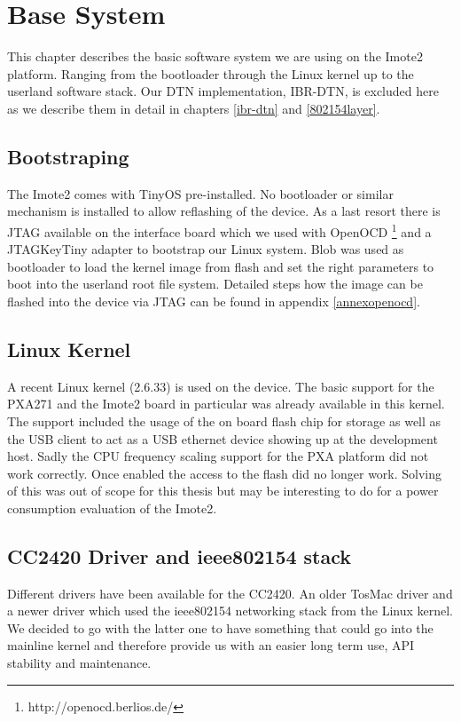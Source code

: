 \chapter{Base System}
This chapter describes the basic software system we are using on the Imote2
platform. Ranging from the bootloader through the Linux kernel up to the
userland software stack. Our DTN implementation, IBR-DTN, is excluded here as we
describe them in detail in chapters \ref{ibr-dtn} and \ref{802154layer}.

\section{Bootstraping}
The Imote2 comes with TinyOS pre-installed. No bootloader or similar mechanism
is installed to allow reflashing of the device. As a last resort there is JTAG
available on the interface board which we used  with OpenOCD
\footnote{http://openocd.berlios.de/} and a
JTAGKeyTiny adapter to bootstrap our Linux system. Blob was used as bootloader to
load the kernel image from flash and set the right parameters to boot into the
userland root file system. Detailed steps how the image can be flashed into the
device via JTAG can be found in appendix \ref{annexopenocd}.

\section{Linux Kernel}
A recent Linux kernel (2.6.33) is used on the device. The basic support for the
PXA271 and the Imote2 board in particular was already available in this kernel.
The support included the usage of the on board flash chip for storage as well as
the USB client to act as a USB ethernet device showing up at the development host.
Sadly the CPU frequency scaling support for the PXA platform did not work
correctly. Once enabled the access to the flash did no longer work.
Solving of this was out of scope for this thesis but may be interesting to do for a
power consumption evaluation of the Imote2.

\section{CC2420 Driver and ieee802154 stack}
Different drivers have been available for the CC2420. An older TosMac driver and
a newer driver which used the ieee802154 networking stack from the Linux kernel.
We decided to go with the latter one to have something that could go into the
mainline kernel and therefore provide us with an easier long term use, API
stability and maintenance.

